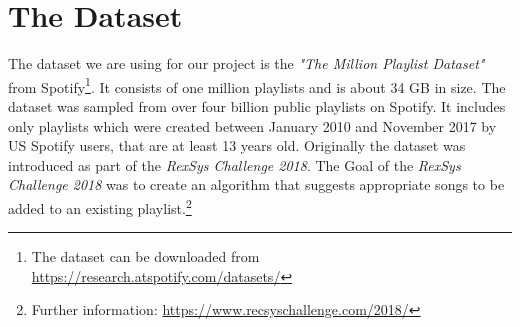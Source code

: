 \section{The Dataset}

The dataset we are using for our project is the \textit{"The Million Playlist Dataset"} \citep{recsysChallenge} from Spotify\footnote{The dataset can be downloaded from \url{https://research.atspotify.com/datasets/}}. It consists of one million playlists and is about 34 GB in size. The dataset was sampled from over four billion public playlists on Spotify. It includes only playlists which were created between January 2010 and November 2017 by US Spotify users, that are at least 13 years old. Originally the dataset was introduced as part of the \textit{RexSys Challenge 2018}. The Goal of the \textit{RexSys Challenge 2018} was to create an algorithm that suggests appropriate songs to be added to an existing playlist.\footnote{Further information: \url{https://www.recsyschallenge.com/2018/}}




